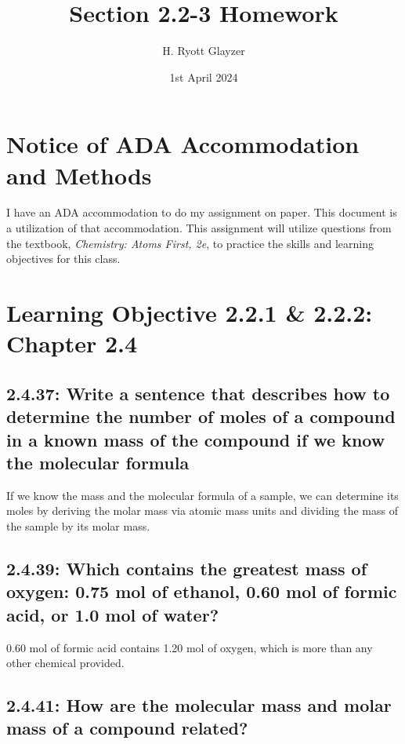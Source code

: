 \documentclass[11pt, letterpaper]{article}
\begin{document}


\title{Section 2.2-3 Homework}
\author{H. Ryott Glayzer}
\date{1st April 2024}


\maketitle


\section*{Notice of ADA Accommodation and Methods}
I have an ADA accommodation to do my assignment on paper.
This document is a utilization of that accommodation.
This assignment will utilize questions from the textbook,
\textit{Chemistry: Atoms First, 2e}, to practice the skills
and learning objectives for this class.

\section*{Learning Objective 2.2.1 \& 2.2.2: Chapter 2.4}
\subsection*{2.4.37: Write a sentence that describes how to determine the number of
moles of a compound in a known mass of the compound if we know the molecular formula}

If we know the mass and the molecular formula of a sample, we can determine its moles
by deriving the molar mass via atomic mass units and dividing the mass of the sample 
by its molar mass.

\subsection*{2.4.39: Which contains the greatest mass of oxygen: 0.75 mol of ethanol,
0.60 mol of formic acid, or 1.0 mol of water?}

0.60 mol of formic acid contains 1.20 mol of oxygen, which is more than any other
chemical provided.

\subsection*{2.4.41: How are the molecular mass and molar mass of a compound related?}
\end{document}
